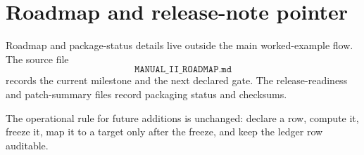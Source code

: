 \section{Roadmap and release-note pointer}

Roadmap and package-status details live outside the main worked-example flow. The source file
\[
\texttt{MANUAL\_II\_ROADMAP.md}
\]
records the current milestone and the next declared gate. The release-readiness and patch-summary files record packaging status and checksums.

The operational rule for future additions is unchanged: declare a row, compute it, freeze it, map it to a target only after the freeze, and keep the ledger row auditable.
